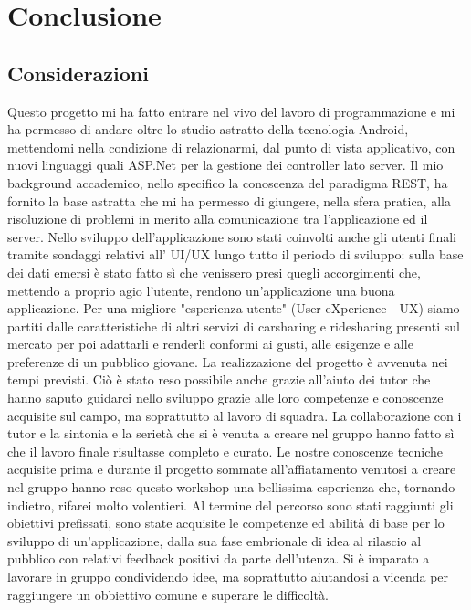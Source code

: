 \chapter{Conclusione}

\section{Considerazioni}
Questo progetto mi ha fatto entrare nel vivo del lavoro di programmazione e mi ha permesso di andare oltre lo studio astratto della tecnologia Android, mettendomi nella condizione di relazionarmi, dal punto di vista applicativo, con nuovi linguaggi quali ASP.Net per la gestione dei controller lato server. 
Il mio background accademico, nello specifico la conoscenza del paradigma REST, ha fornito la base astratta che mi ha permesso di giungere, nella sfera pratica, alla risoluzione di problemi in merito alla comunicazione tra l’applicazione ed il server. 
Nello sviluppo dell’applicazione sono stati coinvolti anche gli utenti finali tramite sondaggi relativi all’ UI/UX lungo tutto il periodo di sviluppo: sulla base dei dati emersi è stato fatto sì che venissero presi quegli accorgimenti che, mettendo a proprio agio l’utente, rendono un’applicazione una buona applicazione.
Per una migliore "esperienza utente" (User eXperience - UX) siamo partiti dalle caratteristiche di altri servizi di carsharing e ridesharing presenti sul mercato per poi adattarli e renderli conformi ai gusti, alle esigenze e alle preferenze di un pubblico giovane.
La realizzazione del progetto è avvenuta nei tempi previsti. Ciò è stato reso possibile anche grazie all'aiuto dei tutor che hanno saputo guidarci nello sviluppo grazie alle loro competenze e conoscenze acquisite sul campo, ma soprattutto al lavoro di squadra. La collaborazione con i tutor e la sintonia e la serietà che si è venuta a creare nel gruppo hanno fatto sì che il lavoro finale risultasse completo e curato. 
Le nostre conoscenze tecniche acquisite prima e durante il progetto sommate all’affiatamento venutosi a creare nel gruppo hanno reso questo workshop una bellissima esperienza che, tornando indietro, rifarei molto volentieri.
Al termine del percorso sono stati raggiunti gli obiettivi prefissati, sono state acquisite le competenze ed abilità di base per lo sviluppo di un’applicazione, dalla sua fase embrionale di idea al rilascio al pubblico con relativi feedback positivi da parte dell’utenza. 
Si è imparato a lavorare in gruppo condividendo idee, ma soprattutto aiutandosi a vicenda per raggiungere un obbiettivo comune e superare le difficoltà.

